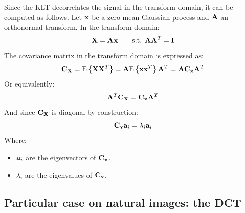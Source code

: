 \documentclass[11pt,a4paper,openright,twoside]{book}
\numberwithin{equation}{section} %
\numberwithin{figure}{section} %
\numberwithin{table}{section} %
\begin{document}
Since the \ac{KLT} decorrelates the signal in the transform domain, it
can be computed as follows.
Let $\mathbf{x}$ be a zero-mean Gaussian process and $\mathbf{A}$ an orthonormal transform.
In the transform domain:
\begin{equation}
	\mathbf{X} = \mathbf{A} \mathbf{x} \qquad \text{s.t. } \mathbf{A} \mathbf{A}^T = \mathbf{I}
\end{equation}
The covariance matrix in the transform domain is expressed as:
\begin{equation}
	\mathbf{C}_{\mathbf{X}} = \text{E}\left\{\mathbf{X} \mathbf{X}^T\right\} = \mathbf{A} \text{E}\left\{\mathbf{x}\mathbf{x}^T\right\}\mathbf{A}^T =
	\mathbf{A}\mathbf{C}_{\mathbf{x}}\mathbf{A}^T
\end{equation}
Or equivalently:
\begin{equation}
	\mathbf{A}^T\mathbf{C}_{\mathbf{X}} = \mathbf{C}_{\mathbf{x}}\mathbf{A}^T
\end{equation}
And since $\mathbf{C}_{\mathbf{X}}$ is diagonal by construction:
\begin{equation}
	\mathbf{C}_{\mathbf{x}} \mathbf{a}_i = \lambda_i\mathbf{a}_i
\end{equation}
Where:
\begin{itemize}
	\item $\mathbf{a}_i$ are the eigenvectors of $\mathbf{C}_{\mathbf{x}}$.
	\item $\lambda_i$ are the eigenvalues of $\mathbf{C}_{\mathbf{x}}$.
\end{itemize}

\subsection{Particular case on natural images: the \acs{DCT}}
\label{sub:particular_case_dct}
\end{document}
